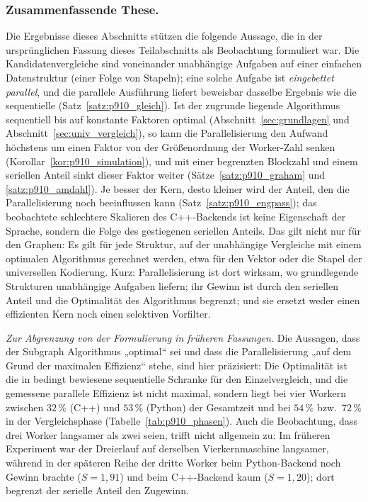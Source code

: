 \documentclass[a4paper,12pt, twoside]{report}
\theoremstyle{definition}
\begin{document}
\subsubsection{Zusammenfassende These.} Die Ergebnisse dieses Abschnitts stützen die folgende Aussage, die in der ursprünglichen Fassung dieses Teilabschnitts als Beobachtung formuliert war. Die Kandidatenvergleiche sind voneinander unabhängige Aufgaben auf einer einfachen Datenstruktur (einer Folge von Stapeln); eine solche Aufgabe ist \emph{eingebettet parallel}, und die parallele Ausführung liefert beweisbar dasselbe Ergebnis wie die sequentielle (Satz~\ref{satz:p910_gleich}). Ist der zugrunde liegende Algorithmus sequentiell bis auf konstante Faktoren optimal (Abschnitt~\ref{sec:grundlagen} und Abschnitt~\ref{sec:univ_vergleich}), so kann die Parallelisierung den Aufwand höchstens um einen Faktor von der Größenordnung der Worker-Zahl senken (Korollar~\ref{kor:p910_simulation}), und mit einer begrenzten Blockzahl und einem seriellen Anteil sinkt dieser Faktor weiter (Sätze~\ref{satz:p910_graham} und \ref{satz:p910_amdahl}). Je besser der Kern, desto kleiner wird der Anteil, den die Parallelisierung noch beeinflussen kann (Satz~\ref{satz:p910_engpass}); das beobachtete schlechtere Skalieren des C++-Backends ist keine Eigenschaft der Sprache, sondern die Folge des gestiegenen seriellen Anteils. Das gilt nicht nur für den Graphen: Es gilt für jede Struktur, auf der unabhängige Vergleiche mit einem optimalen Algorithmus gerechnet werden, etwa für den Vektor oder die Stapel der universellen Kodierung. Kurz: Parallelisierung ist dort wirksam, wo grundlegende Strukturen unabhängige Aufgaben liefern; ihr Gewinn ist durch den seriellen Anteil und die Optimalität des Algorithmus begrenzt; und sie ersetzt weder einen effizienten Kern noch einen selektiven Vorfilter.

\medskip
\noindent\emph{Zur Abgrenzung von der Formulierung in früheren Fassungen.} Die Aussagen, dass der Subgraph Algorithmus „optimal“ sei und dass die Parallelisierung „auf dem Grund der maximalen Effizienz“ stehe, sind hier präzisiert: Die Optimalität ist die in \cite{epp2026subgraph} bedingt bewiesene sequentielle Schranke für den Einzelvergleich, und die gemessene parallele Effizienz ist nicht maximal, sondern liegt bei vier Workern zwischen $32\,\%$ (C++) und $53\,\%$ (Python) der Gesamtzeit und bei $54\,\%$ bzw.\ $72\,\%$ in der Vergleichsphase (Tabelle~\ref{tab:p910_phasen}). Auch die Beobachtung, dass drei Worker langsamer als zwei seien, trifft nicht allgemein zu: Im früheren Experiment war der Dreierlauf auf derselben Vierkernmaschine langsamer, während in der späteren Reihe der dritte Worker beim Python-Backend noch Gewinn brachte ($S=1{,}91$) und beim C++-Backend kaum ($S=1{,}20$); dort begrenzt der serielle Anteil den Zugewinn.
\end{document}
